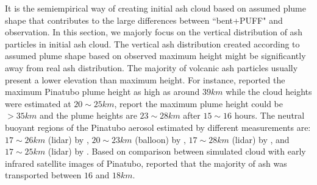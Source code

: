 It is the semiempirical way of creating initial ash cloud based on assumed plume shape that contributes to the large differences between ``bent+PUFF" and observation. In this section, we majorly focus on the vertical distribution of ash particles in initial ash cloud. The vertical ash distribution created according to assumed plume shape based on observed maximum height might be significantly away from real ash distribution.
The majority of volcanic ash particles usually present a lower elevation than maximum height. For instance, \citet{holasek1996satellite, holasek1996experiments} reported the maximum Pinatubo plume height as high as around $39 km$ while the cloud heights were estimated at $20 \sim 25 km $, \citet{self1993atmospheric} report the maximum plume height could be $>35 km$ and the plume heights are $23 \sim 28 km$ after $15 \sim 16$ hours. The neutral buoyant regions of the Pinatubo aerosol estimated by different measurements are: $17 \sim 26 km$ (lidar) by \citet{defoor1992early}, $20 \sim 23 km$ (balloon) by \citet{deshler1992balloonborne}, $17 \sim 28 km$ (lidar) by \citet{jager1992pinatubo}, and $17 \sim 25 km$ (lidar) by \citet{avdyushin19931}. Based on comparison between simulated cloud with early infrared satellite images of Pinatubo, \citet{fero2008simulation} reported that the majority of ash was transported between $16$ and $18 km$. 

